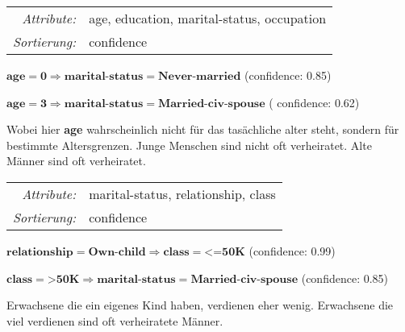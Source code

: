 \begin{boxedminipage}{\textwidth}
\begin{tabular}{rl}
\emph{Attribute:}  & age, education, marital-status, occupation \\
\emph{Sortierung:} &  confidence \\
\end{tabular}
\vspace{0.3cm}

$\textbf{age}= \mathbf{0} \Longrightarrow \textbf{marital-status}= \textbf{Never-married}$    (confidence: 0.85)

$\textbf{age}= \mathbf{3} \Longrightarrow \textbf{marital-status}=\textbf{Married-civ-spouse}$  (  confidence: 0.62)
\end{boxedminipage} \vspace{0.1cm}


Wobei hier \textbf{age} wahrscheinlich nicht f\"ur das tas\"achliche alter steht, sondern f\"ur bestimmte Altersgrenzen. Junge Menschen sind nicht oft verheiratet. Alte M\"anner sind oft verheiratet.

\vspace{0.1cm}

\begin{boxedminipage}{\textwidth}
\begin{tabular}{rl}
\emph{Attribute:}  & marital-status, relationship, class \\
\emph{Sortierung:} &  confidence \\
\end{tabular}
\vspace{0.3cm}

$\textbf{relationship}=\textbf{Own-child} \Longrightarrow \textbf{class} = \textbf{<=50K} $   (confidence: 0.99)

$\textbf{class}=\textbf{>50K} \Longrightarrow \textbf{marital-status}=\textbf{Married-civ-spouse}$ (confidence: 0.85)
\end{boxedminipage} \vspace{0.1cm}

Erwachsene die ein eigenes Kind haben, verdienen eher wenig. Erwachsene die viel verdienen sind oft verheiratete M\"anner.




